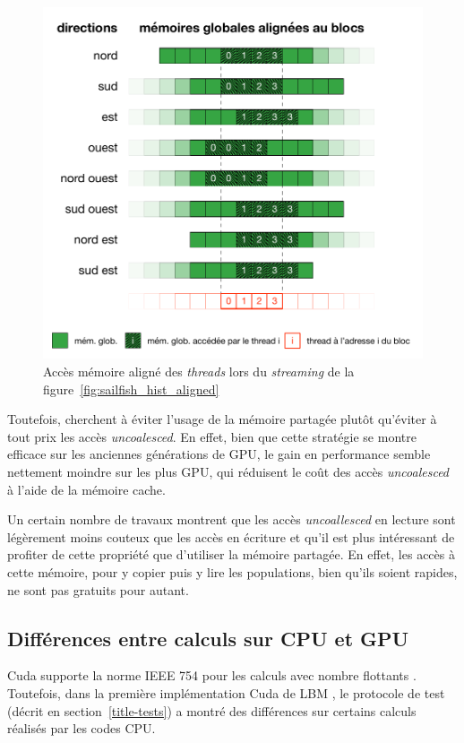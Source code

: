 \begin{figure}[H]
	\centering
	\includegraphics[fbox,scale=1]{images/streaming/sailfish_hist_dir_aligned.pdf}
	\caption{Accès mémoire aligné des \textit{threads} lors du \textit{streaming} de la figure~\ref{fig:sailfish_hist_aligned}}
	\label{fig:sailfish_hist_dir_aligned}
\end{figure}

Toutefois, \citet{obrecht_global_2011} cherchent à éviter l'usage de la mémoire partagée plutôt qu'éviter à tout prix les accès \textit{uncoalesced}. En effet, bien que cette stratégie se montre efficace sur les anciennes générations de \acs{GPU}, le gain en performance semble nettement moindre sur les plus \acs{GPU}, qui réduisent le coût des accès \textit{uncoalesced} à l'aide de la mémoire cache. 

Un certain nombre de travaux montrent que les accès \textit{uncoallesced} en lecture sont légèrement moins couteux que les accès en écriture et qu'il est plus intéressant de profiter de cette propriété que d'utiliser la mémoire partagée. En effet, les accès à cette mémoire, pour y copier puis y lire les populations, bien qu'ils soient rapides, ne sont pas gratuits pour autant.

\subsection{Différences entre calculs sur CPU et GPU} \label{title-floats}
Cuda supporte la norme IEEE 754 pour les calculs avec nombre flottants \cite{ZZZweb_cuda_2017}. Toutefois, dans la première implémentation Cuda de \acs{LBM} , le protocole de test (décrit en section~\ref{title-tests}) a montré des différences sur certains calculs réalisés par les codes \acs{CPU}.

